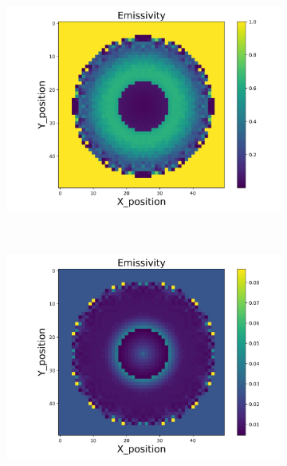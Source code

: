 \begin{figure}[p]
\begin{minipage}{\textwidth}
\begin{subfigure}{0.325\textwidth}
            \includegraphics[width=\textwidth]{figures/raw_data/31/lin_square/emi_cal.jpg}
        \end{subfigure}
    \end{minipage}\\
    \begin{minipage}{\textwidth}
        \centering
        \begin{subfigure}{0.325\textwidth}
            \centering
            \includegraphics[width=\textwidth]{figures/raw_data/32/lin_square/emi_cal.jpg}
        \end{subfigure}
        \begin{subfigure}{0.325\textwidth}

\end{subfigure}
\end{minipage}
\end{figure}
